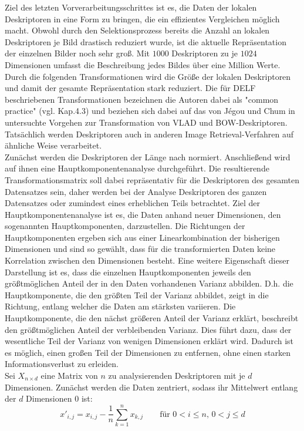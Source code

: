 Ziel des letzten Vorverarbeitungsschrittes ist es, die Daten der lokalen Deskriptoren in eine Form zu bringen, die ein effizientes Vergleichen möglich macht. Obwohl durch den Selektionsprozess bereits die Anzahl an lokalen Deskriptoren je Bild drastisch reduziert wurde, ist die aktuelle Repräsentation der einzelnen Bilder noch sehr groß. Mit $1000$ Deskriptoren zu je $1024$ Dimensionen umfasst die Beschreibung jedes Bildes über eine Million Werte. Durch die folgenden Transformationen wird die Größe der lokalen Deskriptoren und damit der gesamte Repräsentation stark reduziert. Die für DELF beschriebenen Transformationen bezeichnen die Autoren dabei als "common practice" (vgl. \cite{delf} Kap.4.3) und beziehen sich dabei auf das von Jégou und Chum in \cite{common_practice} untersuchte Vorgehen zur Transformation von VLAD und BOW-Deskriptoren. Tatsächlich werden Deskriptoren auch in anderen Image Retrieval-Verfahren \cite{convnet} \cite{one} auf ähnliche Weise verarbeitet.
\\
Zunächst werden die Deskriptoren der Länge nach normiert. Anschließend wird auf ihnen eine Hauptkomponentenanalyse durchgeführt. Die resultierende Transformationsmatrix soll dabei repräsentativ für die Deskriptoren des gesamten Datensatzes sein, daher werden bei der Analyse Deskriptoren des ganzen Datensatzes oder zumindest eines erheblichen Teils betrachtet. Ziel der Hauptkomponentenanalyse ist es, die Daten anhand neuer Dimensionen, den sogenannten Hauptkomponenten, darzustellen. Die Richtungen der Hauptkomponenten ergeben sich aus einer Linearkombination der bisherigen Dimensionen und sind so gewählt, dass für die transformierten Daten keine Korrelation zwischen den Dimensionen besteht. Eine weitere Eigenschaft dieser Darstellung ist es, dass die einzelnen Hauptkomponenten jeweils den größtmöglichen Anteil der in den Daten vorhandenen Varianz abbilden. D.h. die Hauptkomponente, die den größten Teil der Varianz abbildet, zeigt in die Richtung, entlang welcher die Daten am stärksten variieren. Die Hauptkomponente, die den nächst größeren Anteil der Varianz erklärt, beschreibt den größtmöglichen Anteil der verbleibenden Varianz. Dies führt dazu, dass der wesentliche Teil der Varianz von wenigen Dimensionen erklärt wird. Dadurch ist es möglich, einen großen Teil der Dimensionen zu entfernen, ohne einen starken Informationsverlust zu erleiden.
\\
Sei $X_{n\times d}$ eine Matrix von $n$ zu analysierenden Deskriptoren mit je $d$ Dimensionen. 
Zunächst werden die Daten zentriert, sodass ihr Mittelwert entlang der $d$ Dimensionen $0$ ist:
\begin{equation}
x'_{i,j} = x_{i,j}-\frac{1}{n}\sum_{k=1}^n{x_{k,j}}\qquad \text{für }0<i\leq n\text{, }0<j\leq d
\end{equation}

